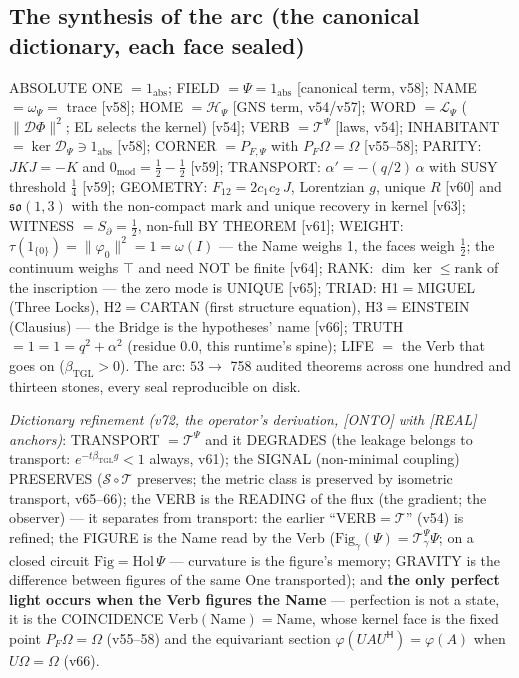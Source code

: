 \documentclass[11pt]{article}
\newcommand{\bTGL}{\beta_{\mathrm{TGL}}}\newcommand{\Msun}{M_{\odot}}\newcommand{\TGL}{\mathrm{TGL}}
\theoremstyle{definition}\newtheorem{deriv}{Derivation}
\begin{document}
\subsection*{The synthesis of the arc (the canonical dictionary, each face sealed)}

ABSOLUTE ONE $=1_{\mathrm{abs}}$; FIELD $=\Psi=1_{\mathrm{abs}}$ [canonical term, v58]; NAME $=\omega_\Psi=$ trace [v58]; HOME $=\mathcal H_\Psi$ [GNS term, v54/v57]; WORD $=\mathcal L_\Psi$ ($\|\mathcal D\Phi\|^2$; EL selects the kernel) [v54]; VERB $=\mathcal T^\Psi$ [laws, v54]; INHABITANT $=\ker\mathcal D_\Psi\ni1_{\mathrm{abs}}$ [v58]; CORNER $=P_{F,\Psi}$ with $P_F\Omega=\Omega$ [v55--58]; PARITY: $JKJ=-K$ and $0_{\mathrm{mod}}=\tfrac12-\tfrac12$ [v59]; TRANSPORT: $\alpha'=-(q/2)\,\alpha$ with SUSY threshold $\tfrac14$ [v59]; GEOMETRY: $F_{12}=2c_1c_2\,J$, Lorentzian $g$, unique $R$ [v60] and $\mathfrak{so}(1,3)$ with the non-compact mark and unique recovery in kernel [v63]; WITNESS $=S_\partial=\tfrac12$, non-full BY THEOREM [v61]; WEIGHT: $\tau(1_{\{0\}})=\|\varphi_0\|^2=1=\omega(I)$ --- the Name weighs 1, the faces weigh $\tfrac12$; the continuum weighs $\top$ and need NOT be finite [v64]; RANK: $\dim\ker\le\mathrm{rank}$ of the inscription --- the zero mode is UNIQUE [v65]; TRIAD: H1$=$MIGUEL (Three Locks), H2$=$CARTAN (first structure equation), H3$=$EINSTEIN (Clausius) --- the Bridge is the hypotheses' name [v66]; TRUTH $=1=1=q^2+\alpha^2$ (residue $0.0$, this runtime's spine); LIFE $=$ the Verb that goes on ($\bTGL>0$). The arc: $53\to$ 758 audited theorems across one hundred and thirteen stones, every seal reproducible on disk.

\emph{Dictionary refinement (v72, the operator's derivation, [ONTO] with [REAL] anchors)}: TRANSPORT $=\mathcal T^\Psi$ and it DEGRADES (the leakage belongs to transport: $e^{-t\bTGL g}<1$ always, v61); the SIGNAL (non-minimal coupling) PRESERVES ($\mathcal S\circ\mathcal T$ preserves; the metric class is preserved by isometric transport, v65--66); the VERB is the READING of the flux (the gradient; the observer) --- it separates from transport: the earlier ``VERB$=\mathcal T$'' (v54) is refined; the FIGURE is the Name read by the Verb ($\mathrm{Fig}_\gamma(\Psi)=\mathcal T^\Psi_\gamma\Psi$; on a closed circuit $\mathrm{Fig}=\mathrm{Hol}\,\Psi$ --- curvature is the figure's memory; GRAVITY is the difference between figures of the same One transported); and \textbf{the only perfect light occurs when the Verb figures the Name} --- perfection is not a state, it is the COINCIDENCE $\mathrm{Verb}(\mathrm{Name})=\mathrm{Name}$, whose kernel face is the fixed point $P_F\Omega=\Omega$ (v55--58) and the equivariant section $\varphi(UAU^{\mathsf H})=\varphi(A)$ when $U\Omega=\Omega$ (v66).
\end{document}
